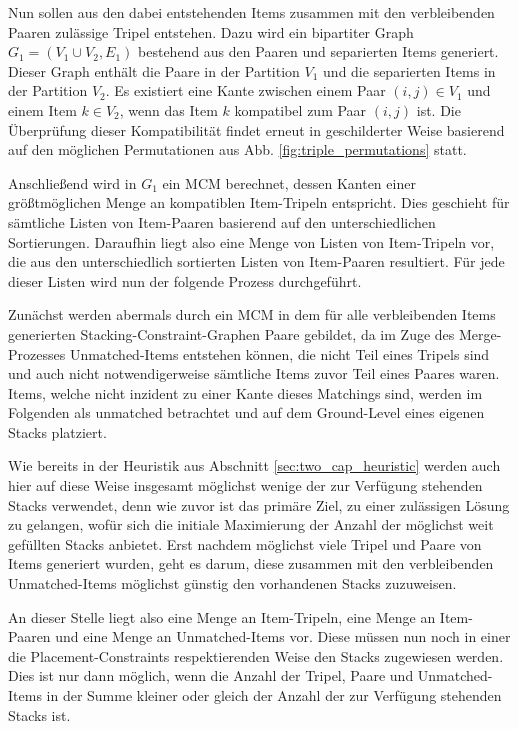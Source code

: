Nun sollen aus den dabei entstehenden Items zusammen mit den verbleibenden Paaren zulässige Tripel entstehen.
Dazu wird ein bipartiter Graph $G_1 = (V_1 \cup V_2, E_1)$ bestehend aus den Paaren und separierten Items generiert.
Dieser Graph enthält die Paare in der Partition $V_1$ und die separierten Items in der Partition $V_2$.
Es existiert eine Kante zwischen einem Paar $(i, j) \in V_1$ und einem Item $k \in V_2$, wenn das Item $k$ kompatibel zum Paar
$(i, j)$ ist. Die Überprüfung dieser Kompatibilität findet erneut in geschilderter Weise basierend auf den möglichen Permutationen
aus Abb. \ref{fig:triple_permutations} statt.

Anschließend wird in $G_1$ ein \textsc{MCM} berechnet, dessen Kanten einer größtmöglichen Menge an kompatiblen Item-Tripeln entspricht.
Dies geschieht für sämtliche Listen von Item-Paaren basierend auf den unterschiedlichen Sortierungen.
Daraufhin liegt also eine Menge von Listen von Item-Tripeln vor, die aus den unterschiedlich sortierten Listen von Item-Paaren resultiert.
Für jede dieser Listen wird nun der folgende Prozess durchgeführt.

Zunächst werden abermals durch ein \textsc{MCM} in dem für alle verbleibenden Items generierten Stacking-Constraint-Graphen
Paare gebildet, da im Zuge des Merge-Prozesses Unmatched-Items entstehen können, die nicht Teil eines Tripels sind und auch nicht notwendigerweise
sämtliche Items zuvor Teil eines Paares waren. Items, welche nicht inzident zu einer Kante dieses Matchings sind, werden im Folgenden als unmatched betrachtet und auf dem Ground-Level eines eigenen Stacks platziert.

Wie bereits in der Heuristik aus Abschnitt \ref{sec:two_cap_heuristic} werden auch hier auf diese Weise insgesamt möglichst wenige der zur Verfügung stehenden Stacks verwendet, denn wie zuvor ist das primäre Ziel, zu einer zulässigen Lösung zu gelangen, wofür sich die initiale Maximierung der Anzahl der möglichst weit gefüllten Stacks anbietet. Erst nachdem möglichst viele Tripel und Paare von Items generiert wurden, geht es darum, diese zusammen mit den verbleibenden Unmatched-Items möglichst günstig den vorhandenen Stacks zuzuweisen.

An dieser Stelle liegt also eine Menge an Item-Tripeln, eine Menge an Item-Paaren und eine Menge an Unmatched-Items vor. Diese müssen nun
noch in einer die Placement-Constraints respektierenden Weise den Stacks zugewiesen werden.
Dies ist nur dann möglich, wenn die Anzahl der Tripel, Paare und Unmatched-Items in der Summe kleiner oder gleich der Anzahl
der zur Verfügung stehenden Stacks ist.


